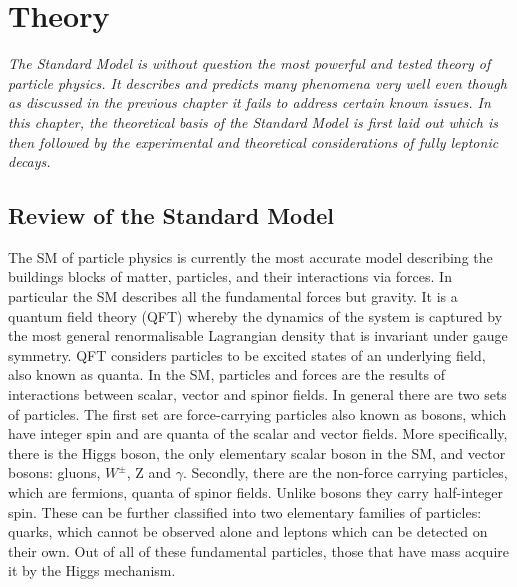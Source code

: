 \chapter{Theory}
\label{stheory}
\textit{The Standard Model is without question the most powerful and tested theory of particle physics. It describes and predicts many phenomena very well even though as discussed in the previous chapter it fails to address certain known issues. In this chapter, the theoretical basis of the Standard Model is first laid out which is then followed by the experimental and theoretical considerations of fully leptonic decays. }



\section{Review of the Standard Model}
The \gls{SM} of particle physics is currently the most accurate model describing the buildings blocks of matter, particles, and their interactions via forces. In particular the \gls{SM} describes all the fundamental forces but gravity. It is a quantum field theory (\gls{QFT}) whereby the dynamics of the system is captured by the most general renormalisable Lagrangian density that is invariant under gauge symmetry. \gls{QFT} considers particles to be excited states of an underlying field, also known as quanta. In the \gls{SM}, particles and forces are the results of interactions between scalar, vector and spinor fields. In general there are two sets of particles. The first set are force-carrying particles also known as bosons, which have integer spin and are quanta of the scalar and vector fields. More specifically, there is the Higgs boson, the only elementary scalar boson in the \gls{SM}, and vector bosons: gluons, $W^{\pm}$, Z and $\gamma$. Secondly, there are the non-force carrying particles, which are fermions, quanta of spinor fields. Unlike bosons they carry half-integer spin. These can be further classified into two elementary families of particles: quarks, which cannot be observed alone and leptons which can be detected on their own. Out of all of these fundamental particles, those that have mass acquire it by the Higgs mechanism.


